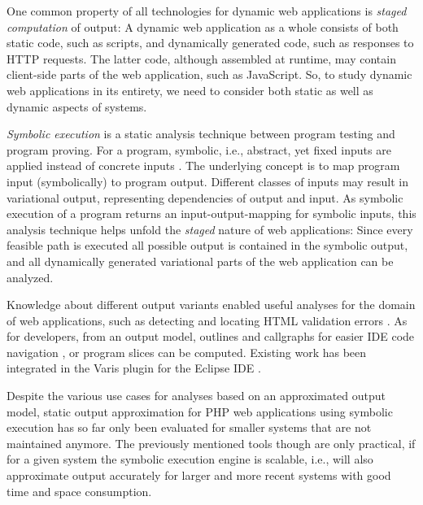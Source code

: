 \documentclass[sigconf]{acmart}
\begin{document}
One common property of all technologies for dynamic web applications is
\emph{staged computation} of output: A dynamic web application as a whole
consists of both static code, such as scripts, and dynamically generated code,
such as responses to HTTP requests. The latter code, although assembled at
runtime, may contain client-side parts of the web application, such as
JavaScript. So, to study dynamic web applications in its entirety, we need to
consider both static as well as dynamic aspects of systems.


\emph{Symbolic execution} is a static analysis technique between program testing
and program proving. For a program, symbolic, i.e., abstract, yet fixed inputs are
applied instead of concrete inputs \cite{Darringer1978,King1976}. The underlying
concept is to map program input (symbolically) to program output. Different classes of inputs may
result in variational output, representing dependencies of output and input.
As symbolic execution of a program returns an input-output-mapping for symbolic
inputs, this analysis technique helps unfold the \emph{staged} nature of web
applications: Since every feasible path is executed all possible output is
contained in the symbolic output, and all dynamically generated variational
parts of the web application can be analyzed.

Knowledge about different output variants enabled useful analyses
for the domain of web applications, such as detecting and locating HTML
validation errors \cite{Nguyen:2011:AFH:2190078.2190142}. As for developers,
from an output model, outlines and callgraphs for easier IDE code navigation
\cite{Nguyen:2014:BCG:2635868.2635928}, or program slices
\cite{Nguyen:2015:CPS:2786805.2786872} can be computed. Existing work has been
integrated in the Varis plugin for the Eclipse IDE \cite{Nguyen:2015:VIS:2819009.2819140}.

Despite the various use cases for analyses based on an approximated output
model, static output approximation for PHP web applications using symbolic
execution has so far only been evaluated for smaller systems that are not
maintained anymore. The previously mentioned tools though are only practical, if
for a given system the symbolic execution engine is scalable, i.e., will also
approximate output accurately for larger and more recent systems with good time
and space consumption.
\end{document}
